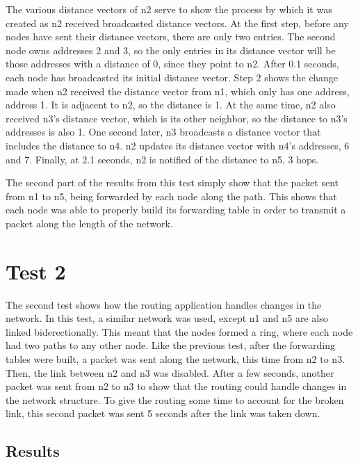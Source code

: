 \documentclass[fleqn,11pt]{article}
\begin{document}
	The various distance vectors of n2 serve to show the process by which it was created as n2 received
	broadcasted distance vectors. At the first step, before any nodes have sent their distance vectors, there are
	only two entries. The second node owns addresses 2 and 3, so the only entries in its distance vector will be those addresses with a distance of 0, since they point to n2. After 0.1 seconds, each node has broadcasted its initial 
	distance vector. Step 2 shows the change made when n2 received the distance
	vector from n1, which only has one address, address 1. It is adjacent to n2, so the distance is 1. At the same time,
	n2 also received n3's distance vector, which is its other neighbor, so the distance to n3's addresses is also
	1. One second later, n3 broadcasts a distance vector that includes the distance to n4. n2 updates its distance vector
	with n4's addresses, 6 and 7. Finally, at 2.1 seconds, n2 is notified of the distance to n5, 3 hops.
	
	The second part of the results from this test simply show that the packet sent from n1 to n5, being forwarded by
	each node along the path. This shows that each node was able to properly build its forwarding table in order to
	transmit a packet along the length of the network.
	
	\section{Test 2}
	
	The second test shows how the routing application handles changes in the network. In this test, a similar network
	was used, except n1 and n5 are also linked biderectionally. This meant that the nodes formed a ring, where each node had two paths to any other node. Like the previous test, after the forwarding tables
	were built, a packet was sent along the network, this time from n2 to n3. Then, the link between n2 and n3 was
	disabled. After a few seconds, another packet was sent from n2 to n3 to show that the routing could handle
	changes in the network structure. To give the routing some time to account for the broken link, this second
	packet was sent 5 seconds after the link was taken down.
	
	
	\subsection{Results}
	
\end{document}
